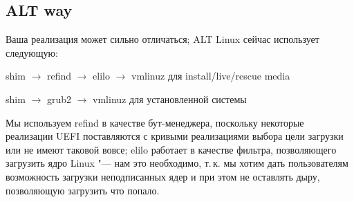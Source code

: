 \documentclass[10pt, a5paper]{article}
\begin{document}
\newpage
\subsection*{ALT way}

Ваша  реализация может сильно отличаться; ALT Linux сейчас использует следующую:

shim $\rightarrow$ refind $\rightarrow$ elilo $\rightarrow$ vmlinuz для install/live/rescue media 

shim $\rightarrow$ grub2 $\rightarrow$ vmlinuz для установленной системы

Мы используем refind в качестве бут-менеджера, поскольку некоторые реализации UEFI поставляются с кривыми реализациями выбора цели загрузки или не имеют таковой вовсе; elilo работает в качестве фильтра, позволяющего загрузить ядро Linux "--- нам это необходимо, т.\,к. мы хотим дать пользователям возможность загрузки неподписанных ядер и при этом не оставлять дыру, позволяющую загрузить что попало.
\end{document}
